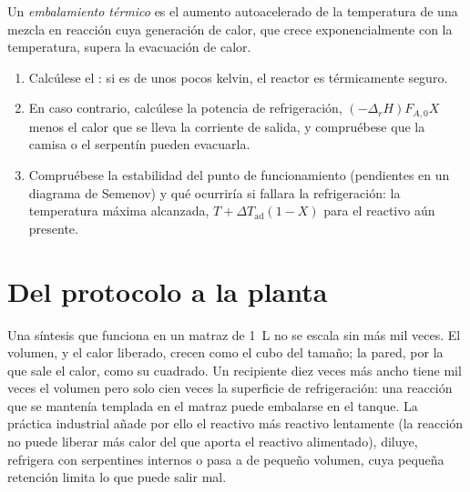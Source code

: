 \begin{definition}\label{def:b2:continuous-reactors:runaway}
Un \emph{embalamiento térmico} es el aumento autoacelerado
de la temperatura de una mezcla en reacción cuya generación de calor, que crece
exponencialmente con la temperatura, supera la evacuación de calor.
\end{definition}

\begin{method}\label{met:b2:continuous-reactors:heat-balance}
\begin{enumerate}
  \item Calcúlese el : si es de unos pocos kelvin, el
        reactor es térmicamente seguro.
  \item En caso contrario, calcúlese la potencia de refrigeración, $(-\Delta_r H)F_{A,0}X$ menos el
        calor que se lleva la corriente de salida, y compruébese que la camisa o el serpentín
        pueden evacuarla.
  \item Compruébese la estabilidad del punto de funcionamiento (pendientes en un diagrama
        de Semenov) y qué ocurriría si fallara la refrigeración: la
        temperatura máxima alcanzada, $T + \Delta T_{\text{ad}}(1 - X)$ para
        el reactivo aún presente.
\end{enumerate}
\end{method}

\section{Del protocolo a la planta}

Una síntesis que funciona en un matraz de \qty{1}{L} no se escala sin más
mil veces. El volumen, y el calor liberado, crecen como el cubo del
tamaño; la pared, por la que sale el calor, como su cuadrado. Un recipiente diez
veces más ancho tiene mil veces el volumen pero solo cien veces la
superficie de refrigeración: una reacción que se mantenía templada en el matraz puede embalarse en
el tanque. La práctica industrial añade por ello el reactivo más reactivo
lentamente (la reacción no puede liberar más calor del que aporta el reactivo alimentado), diluye,
refrigera con serpentines internos o pasa a  de pequeño volumen,
cuya pequeña retención limita lo que puede salir mal.

